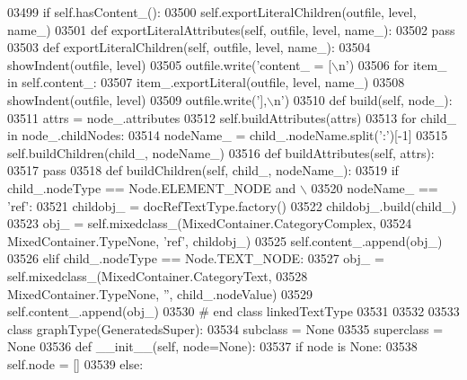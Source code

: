 \begin{DoxyCode}
{{{{{{{{{{{{{{{{{{{{{{{{{{{{{{{{{{{{{{{{{{{{{{{{{{{{{{{{{{{{{{{{{{{{{{{{{{{{{{{{{{{{{{{{{{{{{{{{{{{{{{{{{{{{{{{{{{{{{{{{{{{{{{{{{{{{{{{{{{{{{{{{{{{{{{{{{{{{{{{{{{{{{{{{{{{{{{{{{{{{{{{{{{{{{{{{{{{{{{{{{{{{{{{{{{{{{{{{{{{{{{{{{{{{{{03499         \textcolor{keywordflow}{if} self.hasContent_():
03500             self.exportLiteralChildren(outfile, level, name\_)
03501     \textcolor{keyword}{def }exportLiteralAttributes(self, outfile, level, name\_):
03502         \textcolor{keywordflow}{pass}
03503     \textcolor{keyword}{def }exportLiteralChildren(self, outfile, level, name\_):
03504         showIndent(outfile, level)
03505         outfile.write(\textcolor{stringliteral}{'content\_ = [\(\backslash\)n'})
03506         \textcolor{keywordflow}{for} item\_ \textcolor{keywordflow}{in} self.content\_:
03507             item\_.exportLiteral(outfile, level, name\_)
03508         showIndent(outfile, level)
03509         outfile.write(\textcolor{stringliteral}{'],\(\backslash\)n'})
03510     \textcolor{keyword}{def }build(self, node\_):
03511         attrs = node\_.attributes
03512         self.buildAttributes(attrs)
03513         \textcolor{keywordflow}{for} child\_ \textcolor{keywordflow}{in} node\_.childNodes:
03514             nodeName\_ = child\_.nodeName.split(\textcolor{stringliteral}{':'})[-1]
03515             self.buildChildren(child\_, nodeName\_)
03516     \textcolor{keyword}{def }buildAttributes(self, attrs):
03517         \textcolor{keywordflow}{pass}
03518     \textcolor{keyword}{def }buildChildren(self, child\_, nodeName\_):
03519         \textcolor{keywordflow}{if} child\_.nodeType == Node.ELEMENT\_NODE \textcolor{keywordflow}{and} \(\backslash\)
03520             nodeName\_ == \textcolor{stringliteral}{'ref'}:
03521             childobj\_ = docRefTextType.factory()
03522             childobj\_.build(child\_)
03523             obj\_ = self.mixedclass\_(MixedContainer.CategoryComplex,
03524                 MixedContainer.TypeNone, \textcolor{stringliteral}{'ref'}, childobj\_)
03525             self.content\_.append(obj\_)
03526         \textcolor{keywordflow}{elif} child\_.nodeType == Node.TEXT\_NODE:
03527             obj\_ = self.mixedclass\_(MixedContainer.CategoryText,
03528                 MixedContainer.TypeNone, \textcolor{stringliteral}{''}, child\_.nodeValue)
03529             self.content\_.append(obj\_)
03530 \textcolor{comment}{# end class linkedTextType}
03531 
03532 
03533 \textcolor{keyword}{class }graphType(GeneratedsSuper):
03534     subclass = \textcolor{keywordtype}{None}
03535     superclass = \textcolor{keywordtype}{None}
03536     \textcolor{keyword}{def }__init__(self, node=None):
03537         \textcolor{keywordflow}{if} node \textcolor{keywordflow}{is} \textcolor{keywordtype}{None}:
03538             self.node = []
03539         \textcolor{keywordflow}{else}:
}}}}}}}}}}}}}}}}}}}}}}}}}}}}}}}}}}}}}}}}}}}}}}}}}}}}}}}}}}}}}}}}}}}}}}}}}}}}}}}}}}}}}}}}}}}}}}}}}}}}}}}}}}}}}}}}}}}}}}}}}}}}}}}}}}}}}}}}}}}}}}}}}}}}}}}}}}}}}}}}}}}}}}}}}}}}}}}}}}}}}}}}}}}}}}}}}}}}}}}}}}}}}}}}}}}}}}}}}}}}}}}}}}}}}}
\end{DoxyCode}
